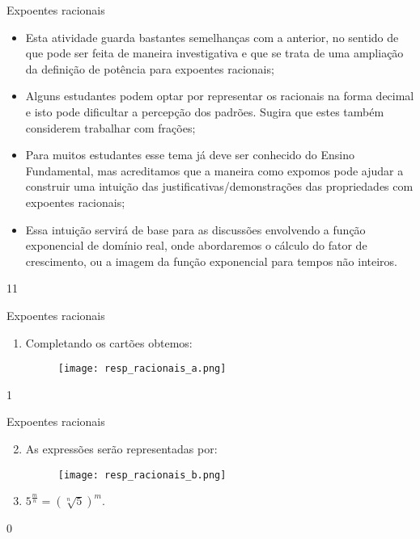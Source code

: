 \marginpar{\vspace{-2.5em}}
\begin{sugestions}{Expoentes racionais}
{
\begin{itemize}

\item Esta atividade guarda bastantes semelhanças com a anterior, no sentido de que pode ser feita de maneira investigativa e que se trata de uma ampliação da definição de potência para expoentes racionais;

\item Alguns estudantes podem optar por representar os racionais na forma decimal e isto pode dificultar a percepção dos padrões. Sugira que estes também considerem trabalhar com frações;

\item Para muitos estudantes esse tema já deve ser conhecido do Ensino Fundamental, mas acreditamos que a maneira como expomos pode ajudar a construir uma intuição das justificativas/demonstrações das propriedades com expoentes racionais;

\item Essa intuição servirá de base para as discussões envolvendo a função exponencial de domínio real, onde abordaremos o cálculo do fator de crescimento, ou a imagem da função exponencial para tempos não inteiros.

\end{itemize}
}{1}{1}
\end{sugestions}
\begin{answer}{Expoentes racionais}
{
\begin{enumerate}

\item Completando os cartões obtemos:

\begin{figure}[H]
\centering
\noindent\texttt{[image: resp\_racionais\_a.png]}
\end{figure}
\end{enumerate}
}{1}
\end{answer}
\begin{answer}{Expoentes racionais}
{
\begin{enumerate}\setcounter{enumi}{1}
\item As expressões serão representadas por:

\begin{figure}[H]
\centering
\noindent\texttt{[image: resp\_racionais\_b.png]}
\end{figure}

\item $5^{\frac{m}{n}}=(\sqrt[n]{5})^{m}$.

\end{enumerate}
}{0}
\end{answer}

